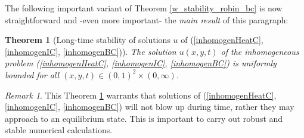 \documentclass[a4paper,11pt]{article}
\theoremstyle{plain} %
\newtheorem{theorem}{Theorem}[section]
\theoremstyle{definition} %
\theoremstyle{remark} %
\newtheorem{remark}{Remark}[section]
\theoremstyle{remark}
\begin{document}
The following important variant of Theorem \ref{w_stability_robin_bc} is now straightforward and -even more important- the \emph{main result} of this paragraph:
\begin{theorem}[Long-time stability of solutions $u$ of (\ref{inhomogenHeatC}, \ref{inhomogenIC}, \ref{inhomogenBC})] \label{u_stability_robin_bc}
The solution $u (x,y, t) $ of the inhomogeneous problem (\ref{inhomogenHeatC}, \ref{inhomogenIC}, \ref{inhomogenBC}) is uniformly bounded for all $(x,y, t) \in (0,1)^2 \times (0,\infty) $.
\end{theorem}
\begin{remark}
This Theorem \ref{u_stability_robin_bc} warrants that solutions of (\ref{inhomogenHeatC}, \ref{inhomogenIC}, \ref{inhomogenBC}) will not blow up during time, rather they may approach to an equilibrium state. This is important to carry out robust and stable numerical calculations.
\end{remark}
%
\end{document}
